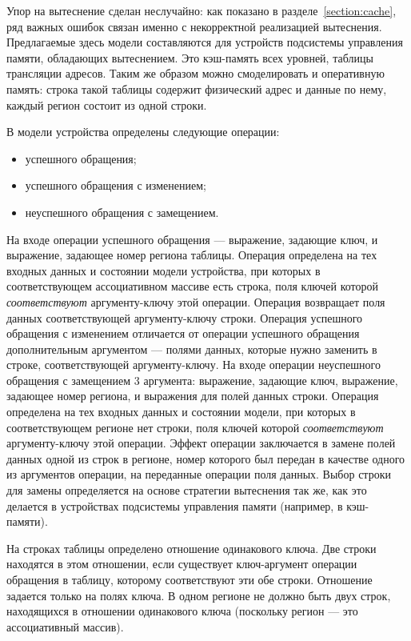 Упор на вытеснение сделан неслучайно: как показано в разделе~\ref{section:cache}, ряд важных ошибок связан именно с некорректной реализацией вытеснения. Предлагаемые здесь модели составляются для устройств подсистемы управления памяти, обладающих вытеснением. Это кэш-память всех уровней, таблицы трансляции адресов. Таким же образом можно смоделировать и оперативную память: строка такой таблицы содержит физический адрес и данные по нему, каждый регион состоит из одной строки.

В модели устройства определены следующие операции:
\begin{itemize}
    \item успешного обращения;
    \item успешного обращения с изменением;
    \item неуспешного обращения с замещением.
\end{itemize}

На входе операции успешного обращения --- выражение, задающие ключ, и выражение, задающее номер региона таблицы. Операция определена на тех входных данных и состоянии модели устройства, при которых в соответствующем ассоциативном массиве есть строка, поля ключей которой \emph{соответствуют} аргументу-ключу этой операции. Операция возвращает поля данных соответствующей аргументу-ключу строки. Операция успешного обращения с изменением отличается от операции успешного обращения дополнительным аргументом --- полями данных, которые нужно заменить в строке, соответствующей аргументу-ключу. На входе операции  неуспешного обращения с замещением 3 аргумента: выражение, задающие ключ, выражение, задающее номер региона, и выражения для полей данных строки. Операция определена на тех входных данных и состоянии модели, при которых в соответствующем регионе нет строки, поля ключей которой \emph{соответствуют} аргументу-ключу этой операции. Эффект операции заключается в замене полей данных одной из строк в регионе, номер которого был передан в качестве одного из аргументов операции, на переданные операции поля данных. Выбор строки для замены определяется на основе стратегии вытеснения так же, как это делается в устройствах подсистемы управления памяти (например, в кэш-памяти).

На строках таблицы определено отношение одинакового ключа. Две строки находятся в этом отношении, если существует ключ-аргумент операции обращения в таблицу, которому соответствуют эти обе строки. Отношение задается только на полях ключа. В одном регионе не должно быть двух строк, находящихся в отношении одинакового ключа (поскольку регион --- это ассоциативный массив).

